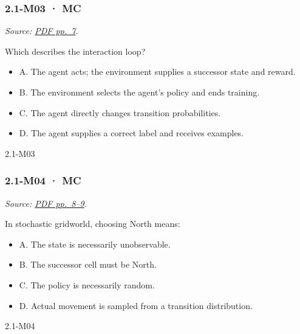 \noindent\begin{minipage}{\linewidth}

\subsubsection{2.1-M03 · MC}\label{m03-mc-3}

\emph{Source:
\href{../Lecture\%20Slides/2.1.\%20Introduction\%20to\%20Reinforcement\%20Learning.pdf\#page=7}{PDF
pp.~7}.}

Which describes the interaction loop?

\begin{itemize}
\tightlist
\item
  A. The agent acts; the environment supplies a successor state and
  reward.
\item
  B. The environment selects the agent's policy and ends training.
\item
  C. The agent directly changes transition probabilities.
\item
  D. The agent supplies a correct label and receives examples.
\end{itemize}

\begin{solution}[8mm]{2.1-M03}

\end{solution}
\end{minipage}\par\medskip

\noindent\begin{minipage}{\linewidth}

\subsubsection{2.1-M04 · MC}\label{m04-mc-3}

\emph{Source:
\href{../Lecture\%20Slides/2.1.\%20Introduction\%20to\%20Reinforcement\%20Learning.pdf\#page=8}{PDF
pp.~8--9}.}

In stochastic gridworld, choosing North means:

\begin{itemize}
\tightlist
\item
  A. The state is necessarily unobservable.
\item
  B. The successor cell must be North.
\item
  C. The policy is necessarily random.
\item
  D. Actual movement is sampled from a transition distribution.
\end{itemize}

\begin{solution}[8mm]{2.1-M04}

\end{solution}
\end{minipage}\par\medskip

